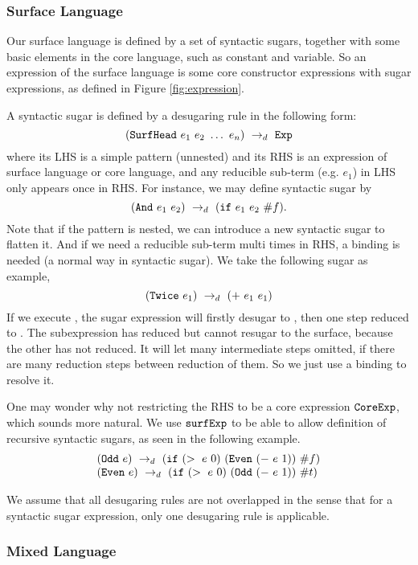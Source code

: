 \subsubsection{Surface Language}

Our surface language is defined by a set of syntactic sugars, together with some basic elements in the core language, such as constant and variable. So an expression of the surface language is some core constructor expressions with sugar expressions, as defined in Figure \ref{fig:expression}.

A syntactic sugar is defined by a desugaring rule in the following form:
\[
(\mbox{\tt SurfHead}~e_1~e_2~\ldots~e_n) ~\rightarrow_d~ \mbox{\tt Exp}
\]
where its LHS is a simple pattern (unnested) and its RHS is an expression of surface language or core language, and any reducible sub-term (e.g. $e_1$) in LHS only appears once in RHS. For instance, we may define syntactic sugar  by
\[
(\mbox{\tt And}~e_1~e_2) ~\rightarrow_d~ (\mbox{\tt if}~e_1~e_2~\#f).
\]
Note that if the pattern is nested, we can introduce a new syntactic sugar to flatten it. And if we need a reducible sub-term multi times in RHS, a  binding is needed (a normal way in syntactic sugar). We take the following sugar as example,
\[(\mbox{\tt Twice}~e_1) ~\rightarrow_d~ (+~e_1~e_1)\]
If we execute , the sugar expression will firstly desugar to , then one step reduced to . The subexpression  has reduced but cannot resugar to the surface, because the other  has not reduced. It will let many intermediate steps omitted, if there are many reduction steps between reduction of them. So we just use a  binding to resolve it.

One may wonder why  not restricting the RHS to be a core expression $\mbox{\tt CoreExp}$, which sounds more natural. We use $\mbox{\tt surfExp}$ to be able to allow definition of recursive syntactic sugars, as seen in the following example.
\[
\begin{array}{l}
(\mbox{\tt Odd}~e) ~\rightarrow_d~ (\mbox{\tt if}~(>~e~0)~(\mbox{\tt Even}~(-~e~1))~\#f)\\
(\mbox{\tt Even}~e) ~\rightarrow_d~ (\mbox{\tt if}~(>~e~0)~(\mbox{\tt Odd}~(-~e~1))~\#t)
\end{array}
\]

We assume that all desugaring rules are not overlapped in the sense that for a syntactic sugar expression, only one desugaring rule is applicable.


\subsubsection{Mixed Language}

